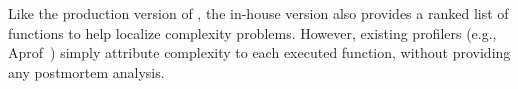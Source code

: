 Like the production version of \Tool, the in-house version also provides a 
ranked list of functions to help localize complexity problems.
However, existing profilers (e.g., Aprof~\cite{Aprof1,Aprof2})  
simply attribute complexity to each executed function, 
without providing any postmortem analysis. 




